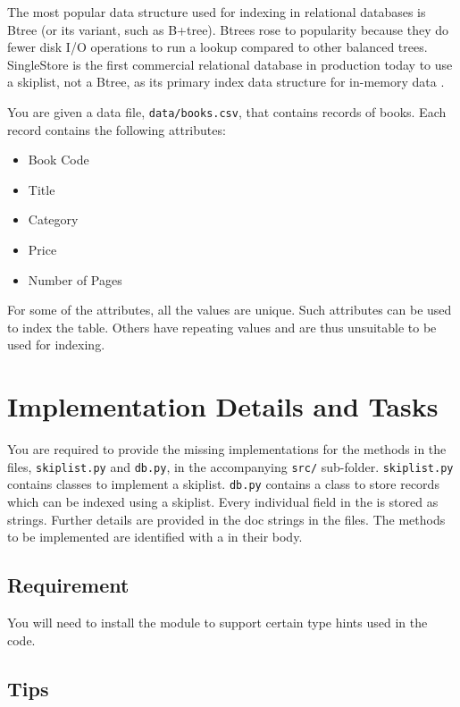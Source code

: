 \documentclass[addpoints]{exam}
\begin{document}
The most popular data structure used for indexing in relational databases is Btree (or its variant, such as B+tree). Btrees rose to popularity because they do fewer disk I/O operations to run a lookup compared to other balanced trees. SingleStore is the first commercial relational database in production today to use a skiplist, not a Btree, as its primary index data structure for in-memory data \cite{singlestore}.

You are given a data file, \texttt{data/books.csv}, that contains records of books. Each record contains the following attributes:
\begin{itemize}
\item Book Code
\item Title
\item Category
\item Price
\item Number of Pages
\end{itemize}
For some of the attributes, all the values are unique. Such attributes can be used to index the table. Others have repeating values and are thus unsuitable to be used for indexing.

\section{Implementation Details and Tasks}

You are required to provide the missing implementations for the methods in the files, \texttt{skiplist.py} and \texttt{db.py}, in the accompanying \texttt{src/} sub-folder. \texttt{skiplist.py} contains classes to implement a skiplist. \texttt{db.py} contains a  class to store records which can be indexed using a skiplist. Every individual field in the  is stored as strings. Further details are provided in the doc strings in the files. The methods to be implemented are identified with a  in their body.

  \subsection{Requirement}

  You will need to install the  module to support certain type hints used in the code.

  \subsection{Tips}
\end{document}
